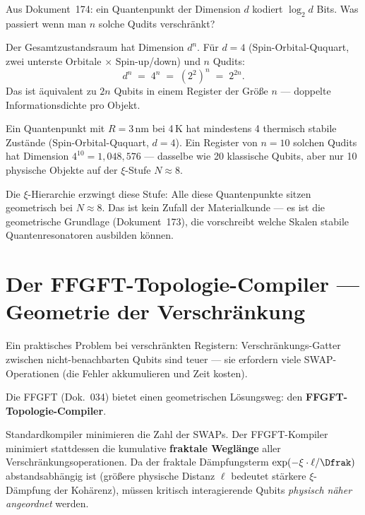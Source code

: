 Aus Dokument~174: ein Quantenpunkt der Dimension $d$
kodiert $\log_2 d$ Bits.
Was passiert wenn man $n$ solche Qudits verschränkt?

Der Gesamtzustandsraum hat Dimension $d^n$.
Für $d = 4$ (Spin-Orbital-Ququart, zwei unterste Orbitale
$\times$ Spin-up/down) und $n$ Qudits:
\begin{equation}
  d^n \;=\; 4^n \;=\; (2^2)^n \;=\; 2^{2n}.
\end{equation}
Das ist äquivalent zu $2n$ Qubits in einem Register
der Größe $n$ --- doppelte Informationsdichte pro Objekt.

\begin{keyresult}
Ein Quantenpunkt mit $R = 3$\,nm bei 4\,K
hat mindestens 4 thermisch stabile Zustände
(Spin-Orbital-Ququart, $d = 4$).
Ein Register von $n = 10$ solchen Qudits
hat Dimension $4^{10} = 1{,}048{,}576$ ---
dasselbe wie 20 klassische Qubits, aber
nur 10 physische Objekte auf der $\xi$-Stufe $N \approx 8$.

Die $\xi$-Hierarchie erzwingt diese Stufe:
Alle diese Quantenpunkte sitzen geometrisch
bei $N \approx 8$. Das ist kein Zufall der
Materialkunde --- es ist die geometrische Grundlage
(Dokument~173), die vorschreibt welche Skalen
stabile Quantenresonatoren ausbilden können.
\end{keyresult}

\section{Der FFGFT-Topologie-Compiler --- Geometrie der Verschränkung}
\label{sec:compiler}

Ein praktisches Problem bei verschränkten Registern:
Verschränkungs-Gatter zwischen nicht-benachbarten Qubits
sind teuer --- sie erfordern viele SWAP-Operationen
(die Fehler akkumulieren und Zeit kosten).

Die FFGFT (Dok.~034) bietet einen geometrischen
Lösungsweg: den \textbf{FFGFT-Topologie-Compiler}.

Standardkompiler minimieren die Zahl der SWAPs.
Der FFGFT-Kompiler minimiert stattdessen die kumulative
\textbf{fraktale Weglänge} aller Verschränkungsoperationen.
Da der fraktale Dämpfungsterm $\exp(-\xi \cdot \ell / \Dfrak)$
abstandsabhängig ist (größere physische Distanz $\ell$
bedeutet stärkere $\xi$-Dämpfung der Kohärenz),
müssen kritisch interagierende Qubits
\emph{physisch näher angeordnet} werden.

